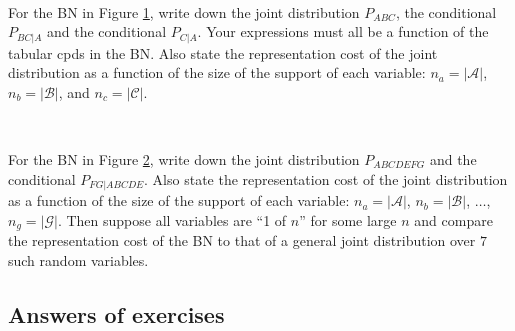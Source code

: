 ~

\begin{Exercise}[label=ABC]
For the BN in Figure \ref{fig:exBN1}, write down the joint distribution $P_{ABC}$, the conditional $P_{BC|A}$ and the conditional $P_{C|A}$. Your expressions must all be a function of the tabular cpds in the BN. 
Also state the representation cost of the joint distribution as a function of the size of the support of each variable: $n_a = |\mathcal A|$, $n_b = |\mathcal B|$, and $n_c = |\mathcal C|$. %
\begin{figure}[h]\centering
	\caption{\label{fig:exBN1}}
\end{figure}
\end{Exercise}

		
~

\begin{Exercise}[label=A-G]
For the BN in Figure \ref{fig:exBN2}, write down the joint distribution $P_{ABCDEFG}$ and the conditional $P_{FG|ABCDE}$. 
Also state the representation cost of the joint distribution as a function of the size of the support of each variable: $n_a = |\mathcal A|$, $n_b = |\mathcal B|$, $\ldots$, $n_g = |\mathcal G|$. 
Then suppose all variables are ``1 of $n$'' for some large $n$ and compare the representation cost of the BN to that of a general joint distribution over $7$ such random variables.
\begin{figure}[h]\centering
	\caption{\label{fig:exBN2}}
\end{figure}
\end{Exercise}


		
\subsection{Answers of exercises}

